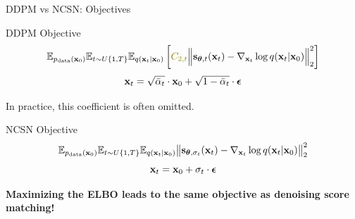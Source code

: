 \documentclass{beamer}
\renewcommand{\eqpause}{}
\begin{document}
\begin{frame}{DDPM vs NCSN: Objectives}
	\begin{block}{DDPM Objective}
		\vspace{-0.5cm}
		\[
			\bbE_{\pd(\bx_0)} \bbE_{t \sim U\{1, T\}}\bbE_{q(\bx_t | \bx_0)} \left[ {\color{olive}C_{2, t}} \Bigl\|  \bs_{\btheta, t} (\bx_t) - \nabla_{\bx_t} \log q(\bx_t | \bx_0) \Bigr\|_2^2  \right]
		\]
		\[
			\mathbf{x}_t = \sqrt{\bar{\alpha}_t} \cdot \mathbf{x}_0 + \sqrt{1 - \bar{\alpha}_t} \cdot \boldsymbol{\epsilon}
		\]
		\eqpause
		In practice, {\color{olive}this coefficient} is often omitted.
	\end{block}
	\eqpause
	\begin{block}{NCSN Objective}
		\vspace{-0.3cm}
		\[
			\mathbb{E}_{p_{\text{data}}(\mathbf{x}_0)} \mathbb{E}_{t \sim U\{1, T\}} \mathbb{E}_{q(\mathbf{x}_t | \mathbf{x}_0)}\bigl\| \mathbf{s}_{\boldsymbol{\theta}, \sigma_t}(\mathbf{x}_t) - \nabla_{\mathbf{x}_t} \log q(\mathbf{x}_t | \mathbf{x}_0) \bigr\|^2_2 
		\]
		\[
			\mathbf{x}_t = \mathbf{x}_0 + \sigma_t \cdot \boldsymbol{\epsilon}
		\]
		\vspace{-0.5cm}
	\end{block}
	\eqpause
	\textbf{Maximizing the ELBO leads to the same objective as denoising score matching!}
\end{frame}
\end{document}
